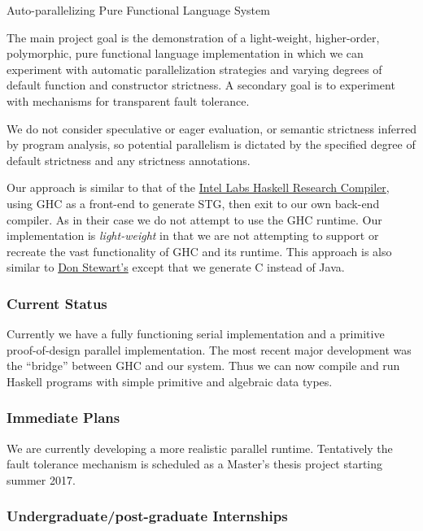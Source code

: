 \begin{hcarentry}[new]{Auto-parallelizing Pure Functional Language System}
\makeheader

The main project goal is the demonstration of a light-weight, higher-order,
polymorphic, pure functional language implementation in which we can
experiment with automatic parallelization strategies and varying degrees of
default function and constructor strictness.  A secondary goal is to
experiment with mechanisms for transparent fault tolerance.

We do not consider speculative or eager evaluation, or semantic strictness
inferred by program analysis, so potential parallelism is dictated by the
specified degree of default strictness and any strictness annotations.

Our approach is similar to that of the
\href{https://dl.acm.org/citation.cfm?id=2503779}{Intel Labs Haskell
Research Compiler}, using GHC as a front-end to generate STG, then
exit to our own back-end compiler.  As in their case we do not attempt to use
the GHC runtime.  Our implementation is \emph{light-weight} in that we are not
attempting to support or recreate the vast functionality of GHC and its
runtime.  This approach is also similar to
\href{http://www.cse.unsw.edu.au/~pls/thesis/dons-thesis.ps.gz}{Don Stewart's}
except that we generate C instead of Java.

\subsubsection*{Current Status}
Currently we have a fully functioning serial implementation and a primitive
proof-of-design parallel implementation.  The most recent major development
was the ``bridge'' between GHC and our system.  Thus we can now compile and run
Haskell programs with simple primitive and algebraic data types.

\subsubsection*{Immediate Plans}

We are currently developing a more realistic parallel runtime.  Tentatively
the fault tolerance mechanism is scheduled as a Master's thesis project starting
summer 2017.

\subsubsection*{Undergraduate/post-graduate Internships}


\end{hcarentry}
